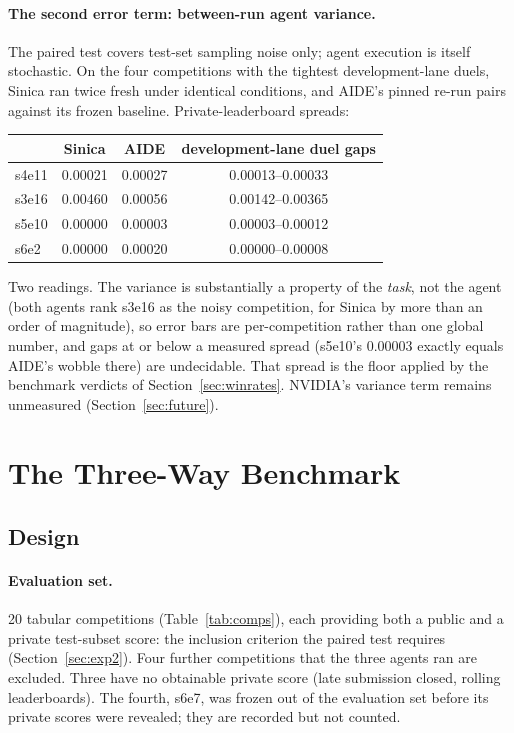 \documentclass[11pt,a4paper]{article}
\begin{document}
\paragraph{The second error term: between-run agent variance.} The paired test covers test-set
sampling noise only; agent execution is itself stochastic. On the four competitions with the
tightest development-lane duels, Sinica ran twice fresh under identical conditions, and AIDE's
pinned re-run pairs against its frozen baseline. Private-leaderboard spreads:

\begin{center}\small
\begin{tabular}{@{}lccc@{}}
\toprule
 & \textbf{Sinica} & \textbf{AIDE} & \textbf{development-lane duel gaps} \\
\midrule
s4e11 & 0.00021 & 0.00027 & 0.00013--0.00033 \\
s3e16 & 0.00460 & 0.00056 & 0.00142--0.00365 \\
s5e10 & 0.00000 & 0.00003 & 0.00003--0.00012 \\
s6e2  & 0.00000 & 0.00020 & 0.00000--0.00008 \\
\bottomrule
\end{tabular}
\end{center}

Two readings. The variance is substantially a property of the \emph{task}, not the agent
(both agents rank s3e16 as the noisy competition, for Sinica by more than an order of magnitude), so error bars are
per-competition rather than one global number, and gaps at or below a measured spread (s5e10's
$0.00003$ exactly equals AIDE's wobble there) are undecidable. That spread is the floor applied by the
benchmark verdicts of Section~\ref{sec:winrates}. NVIDIA's variance term remains unmeasured
(Section~\ref{sec:future}).

\section{The Three-Way Benchmark}

\subsection{Design}

\paragraph{Evaluation set.} 20 tabular competitions (Table~\ref{tab:comps}), each providing both a public and a private test-subset score: the inclusion criterion the paired test requires (Section~\ref{sec:exp2}). Four further competitions that the three agents ran are excluded. Three have no obtainable private score (late submission closed, rolling leaderboards). The fourth, s6e7, was frozen out of the evaluation set before its private scores were revealed; they are recorded but not counted.
\end{document}
